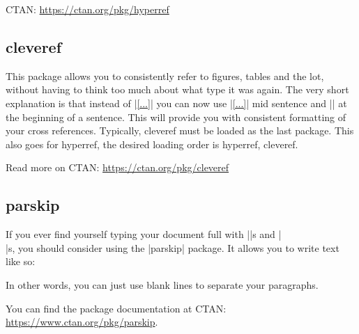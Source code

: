 CTAN: \url{https://ctan.org/pkg/hyperref}


\subsection{cleveref}
This package allows you to consistently refer to figures, tables and the lot, without having to think too much about what type it was again. The very short explanation is that instead of |\ref{...}| you can now use |\cref{...}| mid sentence and || at the beginning of a sentence. This will provide you with consistent formatting of your cross references. Typically, cleveref must be loaded as the last package. This also goes for hyperref, the desired loading order is hyperref, cleveref.

Read more on CTAN: \url{https://ctan.org/pkg/cleveref}

\subsection{parskip}
If you ever find yourself typing your document full with |\noindent|s and |\\|s, you should consider using the |parskip| package. It allows you to write text like so:


In other words, you can just use blank lines to separate your paragraphs.

You can find the package documentation at CTAN: \url{https://www.ctan.org/pkg/parskip}.
